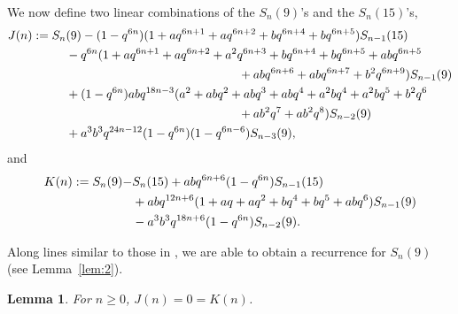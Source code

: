 \documentclass[12pt,twoside]{amsart}
\newtheorem{Lemma}[Theorem]{Lemma}
\theoremstyle{remark}
\numberwithin{equation}{section}
\begin{document}
\medskip
We now define two linear combinations of the $S_n(9)$'s and the $S_n(15)$'s,
\begin{align} \label{eq:32}
  J(n): =
S_n&(9)-(1-q^{6n})(1+aq^{6n+1}+aq^{6n+2}+bq^{6n+4}+bq^{6n+5})S_{n-1}(15)\\
\notag
&-q^{6n}(1+aq^{6n+1}+aq^{6n+2}+a^2q^{6n+3}+bq^{6n+4}+bq^{6n+5}+abq^{6n+5}\\
\notag
&\kern5cm
+abq^{6n+6}+abq^{6n+7}+b^2q^{6n+9})S_{n-1}(9)\\
\notag
&+(1-q^{6n})abq^{18n-3}
(a^2+abq^2+abq^3+abq^4+a^2bq^4+a^2bq^5+b^2q^6\\
\notag
&\kern5cm+ab^2q^7+ab^2q^8)S_{n-2}(9)\\
\notag & +a^3b^3q^{24n-12}(1-q^{6n})(1-q^{6n-6})S_{n-3}(9),
\end{align}
and
\begin{align} \label{eq:33}
K(n) : =  S_n(9) - &S_n(15) + abq^{6n+6}(1 - q^{6n})S_{n-1}(15)\\
\notag
& + abq^{12n+6} (1+aq+aq^2+bq^4+bq^5+abq^6) S_{n-1}(9)\\
\notag
&-a^3b^3q^{18n+6}(1-q^{6n})S_{n-2}(9).
\end{align}

Along lines similar to those in \cite{R3}, we are able to
obtain a recurrence for $S_n(9)$ (see Lemma~\ref{lem:2}).

\begin{Lemma}\label{lem:1}
For $n \geq  0$, $J(n)  =  0  =  K(n)$.
\end{Lemma}
\end{document}
